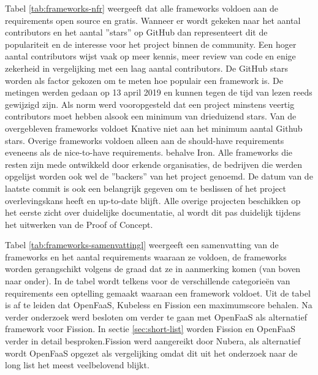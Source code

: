 Tabel \ref{tab:frameworks-nfr} weergeeft dat alle frameworks voldoen aan de requirements open source en gratis. Wanneer er wordt gekeken naar het aantal contributors en het aantal ''stars'' op GitHub dan representeert dit de populariteit en de interesse voor het project binnen de community. Een hoger aantal contributors wijst vaak op meer kennis, meer review van code en enige zekerheid in vergelijking met een laag aantal contributors. De GitHub stars worden als factor gekozen om te meten hoe populair een framework is. De metingen werden gedaan op 13 april 2019 en kunnen tegen de tijd van lezen reeds gewijzigd zijn. Als norm werd vooropgesteld dat een project minstens veertig contributors moet hebben alsook een minimum van drieduizend stars. Van de overgebleven frameworks voldoet Knative niet aan het minimum aantal Github stars. Overige frameworks voldoen alleen aan de should-have requirements eveneens als de nice-to-have requirements. behalve Iron. Alle frameworks die resten zijn mede ontwikkeld door erkende organisaties, de bedrijven die werden opgelijst worden ook wel de ''backers'' van het project genoemd. De datum van de laatste commit is ook een belangrijk gegeven om te beslissen of het project overlevingskans heeft en up-to-date blijft. Alle overige projecten beschikken op het eerste zicht over duidelijke documentatie, al wordt dit pas duidelijk tijdens het uitwerken van de Proof of Concept. 

Tabel \ref{tab:frameworks-samenvattingl} weergeeft een samenvatting van de frameworks en het aantal requirements waaraan ze voldoen, de frameworks worden gerangschikt volgens de graad dat ze in aanmerking komen (van boven naar onder). In de tabel wordt telkens voor de verschillende categorieën van requirements een optelling gemaakt waaraan een framework voldoet. Uit de tabel is af te leiden dat OpenFaaS, Kubeless en Fission een maximumscore behalen. Na verder onderzoek werd besloten om verder te gaan met OpenFaaS als alternatief framework voor Fission. In sectie \ref{sec:short-list} worden Fission en OpenFaaS verder in detail besproken.Fission werd aangereikt door Nubera, als alternatief wordt OpenFaaS opgezet als vergelijking omdat dit uit het onderzoek naar de long list het meest veelbelovend blijkt. 

